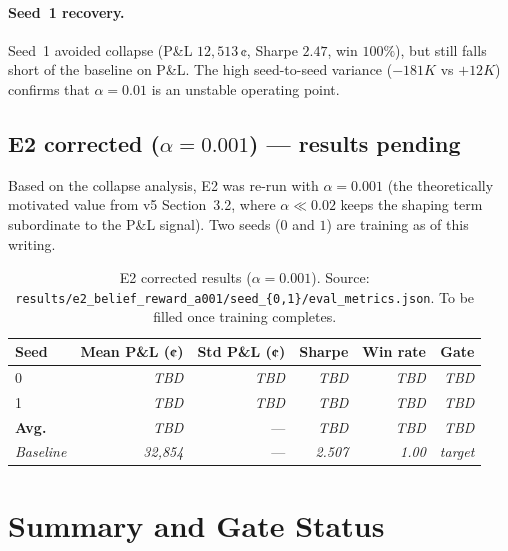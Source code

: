 \documentclass[11pt]{article}
\newcommand{\tbd}{\emph{TBD}}
\begin{document}
\paragraph{Seed~1 recovery.}
Seed~1 avoided collapse (P\&L $12{,}513$\,¢, Sharpe $2.47$, win $100\%$),
but still falls short of the baseline on P\&L.
The high seed-to-seed variance ($-181K$ vs $+12K$) confirms that
$\alpha=0.01$ is an unstable operating point.

\subsection{E2 corrected ($\alpha = 0.001$) --- results pending}
\label{sec:e2corrected}

Based on the collapse analysis, E2 was re-run with $\alpha=0.001$
(the theoretically motivated value from v5 Section~3.2, where
$\alpha \ll 0.02$ keeps the shaping term subordinate to the P\&L signal).
Two seeds ($0$ and $1$) are training as of this writing.

\begin{table}[H]
\centering
\begin{tabular}{lrrrrr}
\toprule
\textbf{Seed} &
\textbf{Mean P\&L (¢)} &
\textbf{Std P\&L (¢)} &
\textbf{Sharpe} &
\textbf{Win rate} &
\textbf{Gate} \\
\midrule
0 & \tbd & \tbd & \tbd & \tbd & \tbd \\
1 & \tbd & \tbd & \tbd & \tbd & \tbd \\
\midrule
\textbf{Avg.} & \tbd & --- & \tbd & \tbd & \tbd \\
\midrule
\textit{Baseline} & \textit{32,854} & --- & \textit{2.507} & \textit{1.00} & \textit{target} \\
\bottomrule
\end{tabular}
\caption{E2 corrected results ($\alpha=0.001$).
         Source: \texttt{results/e2\_belief\_reward\_a001/seed\_\{0,1\}/eval\_metrics.json}.
         To be filled once training completes.}
\label{tab:e2a001}
\end{table}

\section{Summary and Gate Status}
\end{document}
